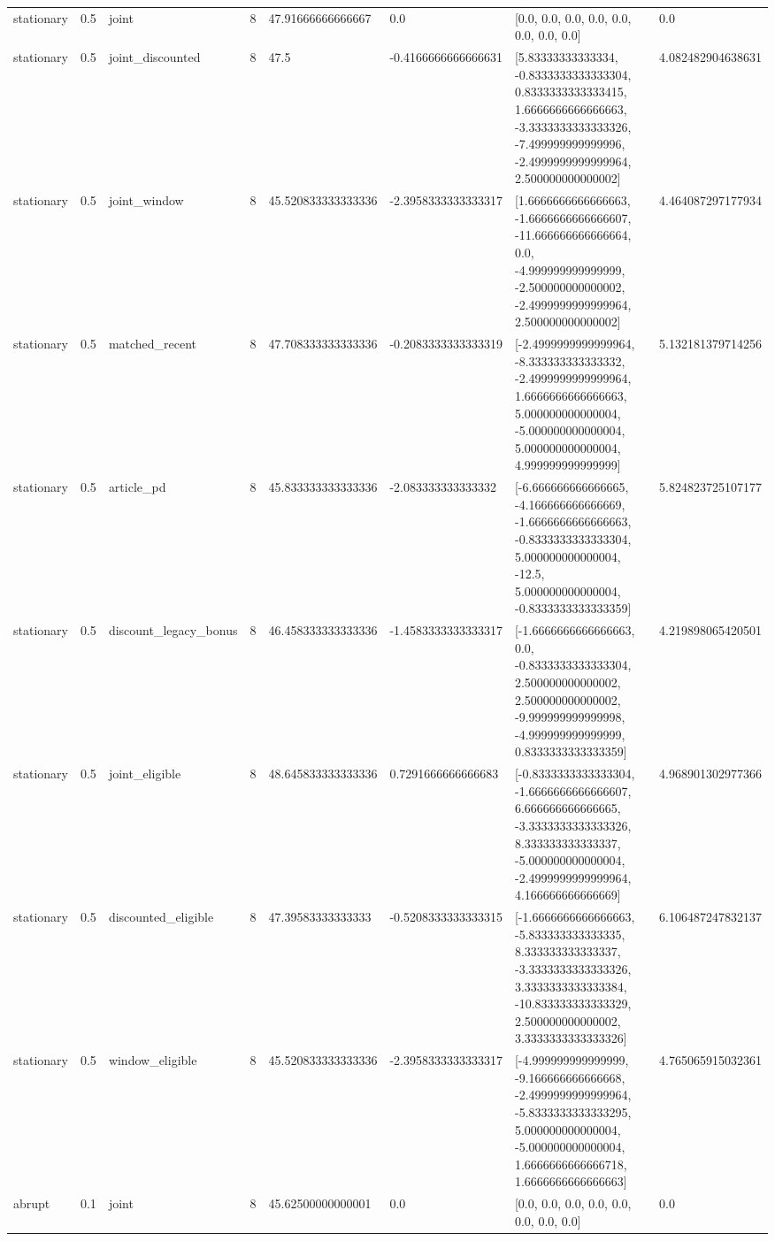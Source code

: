 \begin{tabular}{llllllll}
stationary & 0.5 & joint & 8 & 47.91666666666667 & 0.0 & [0.0, 0.0, 0.0, 0.0, 0.0, 0.0, 0.0, 0.0] & 0.0 \\
stationary & 0.5 & joint\_discounted & 8 & 47.5 & -0.4166666666666631 & [5.83333333333334, -0.8333333333333304, 0.8333333333333415, 1.6666666666666663, -3.3333333333333326, -7.499999999999996, -2.4999999999999964, 2.500000000000002] & 4.082482904638631 \\
stationary & 0.5 & joint\_window & 8 & 45.520833333333336 & -2.3958333333333317 & [1.6666666666666663, -1.6666666666666607, -11.666666666666664, 0.0, -4.999999999999999, -2.500000000000002, -2.4999999999999964, 2.500000000000002] & 4.464087297177934 \\
stationary & 0.5 & matched\_recent & 8 & 47.708333333333336 & -0.2083333333333319 & [-2.4999999999999964, -8.333333333333332, -2.4999999999999964, 1.6666666666666663, 5.000000000000004, -5.000000000000004, 5.000000000000004, 4.999999999999999] & 5.132181379714256 \\
stationary & 0.5 & article\_pd & 8 & 45.833333333333336 & -2.083333333333332 & [-6.666666666666665, -4.166666666666669, -1.6666666666666663, -0.8333333333333304, 5.000000000000004, -12.5, 5.000000000000004, -0.8333333333333359] & 5.824823725107177 \\
stationary & 0.5 & discount\_legacy\_bonus & 8 & 46.458333333333336 & -1.4583333333333317 & [-1.6666666666666663, 0.0, -0.8333333333333304, 2.500000000000002, 2.500000000000002, -9.999999999999998, -4.999999999999999, 0.8333333333333359] & 4.219898065420501 \\
stationary & 0.5 & joint\_eligible & 8 & 48.645833333333336 & 0.7291666666666683 & [-0.8333333333333304, -1.6666666666666607, 6.666666666666665, -3.3333333333333326, 8.333333333333337, -5.000000000000004, -2.4999999999999964, 4.166666666666669] & 4.968901302977366 \\
stationary & 0.5 & discounted\_eligible & 8 & 47.39583333333333 & -0.5208333333333315 & [-1.6666666666666663, -5.833333333333335, 8.333333333333337, -3.3333333333333326, 3.3333333333333384, -10.833333333333329, 2.500000000000002, 3.3333333333333326] & 6.106487247832137 \\
stationary & 0.5 & window\_eligible & 8 & 45.520833333333336 & -2.3958333333333317 & [-4.999999999999999, -9.166666666666668, -2.4999999999999964, -5.8333333333333295, 5.000000000000004, -5.000000000000004, 1.6666666666666718, 1.6666666666666663] & 4.765065915032361 \\
abrupt & 0.1 & joint & 8 & 45.62500000000001 & 0.0 & [0.0, 0.0, 0.0, 0.0, 0.0, 0.0, 0.0, 0.0] & 0.0 \\

\end{tabular}
